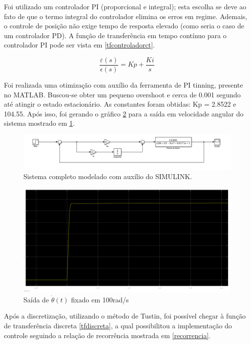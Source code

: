 \documentclass[a4paper,11pt]{article}
\begin{document}
		\newpage
		
		Foi utilizado um controlador PI (proporcional e integral); esta escolha se deve ao fato de que o termo integral do controlador elimina os erros em regime. Ademais, o controle de posição não exige tempo de resposta elevado (como seria o caso de um controlador PD). A função de transferência em tempo contínuo para o controlador PI pode ser vista em \ref{tfcontroladorct}.
		
		\begin{equation}
			\frac{\varepsilon(s)}{\epsilon(s)}= Kp + \frac{Ki}{s}
		\end{equation}
		
		Foi realizada uma otimização com auxílio da ferramenta de PI tinning, presente no MATLAB. Buscou-se obter um pequeno overshoot e cerca de 0.001 segundo até atingir o estado estacionário. As constantes foram obtidas: Kp = 2.8522 e 104.55. Após isso, foi gerando o gráfico \ref{fig:saidasimulada} para a saída em velocidade angular do sistema mostrado em \ref{fig:sistemasimulink}.
		
		\begin{figure}[ht]
			\centering
			\includegraphics[width=0.9\linewidth]{images/sistemaEControlador}
			\caption{Sistema completo modelado com auxílio do SIMULINK\cite{MATLAB}.}
			\label{fig:sistemasimulink}
		\end{figure}
	
		\begin{figure}[ht]
			\centering
			\includegraphics[width=0.7\linewidth]{images/sistemStep}
			\caption{Saída de $\dot{\theta}(t)$ fixado em 100rad/s}
			\label{fig:saidasimulada}
		\end{figure}
		
		Após a discretização, utilizando o método de Tustin, foi possível chegar à função de transferência discreta \ref{tfdiscreta}, a qual possibilitou a implementação do controle seguindo a relação de recorrência mostrada em \ref{recorrencia}.
		
\end{document}
